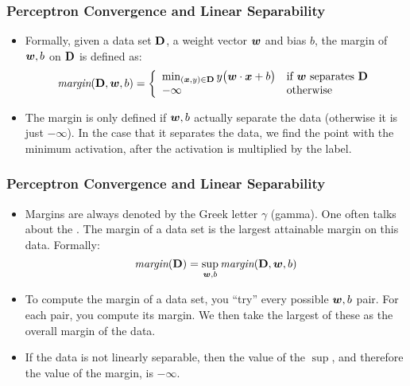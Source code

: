 \documentclass[trans]{beamer}
\begin{document}
\begin{frame}
  \frametitle{Perceptron Convergence and Linear Separability}
\begin{itemize}
\item
Formally, given a data set $\text{\bf D}$, a weight vector ${\boldsymbol{w}}$ and bias
$b$, the margin of ${\boldsymbol{w}},b$ on $\text{\bf D}$ is defined as:
\begin{equation} \label{eq:margin}
\textit{margin}(\text{\bf D}, {\boldsymbol{w}}, b)
= \left\{\begin{array}{ll}
     \min_{({\boldsymbol{x}},y) \in \text{\bf D}} y \big( {\boldsymbol{w}} \cdot {\boldsymbol{x}} + b \big)
      & \text{if ${\boldsymbol{w}}$ separates $\text{\bf D}$} \\
    -\infty & \text{otherwise}
\end{array}\right.
\end{equation}
\item The margin is only defined if ${\boldsymbol{w}},b$ actually separate the
data (otherwise it is just $-\infty$).  In the case that it separates
the data, we find the point with the minimum activation, after the
activation is multiplied by the label.
\end{itemize}
\end{frame}
\begin{frame}
  \frametitle{Perceptron Convergence and Linear Separability}
\begin{itemize}
\item Margins
are always denoted by the Greek letter $\gamma$ (gamma).  One often
talks about the .  The margin of a data
set is the largest attainable margin on this data.  Formally:
\begin{equation} \label{eq:margin2}
\textit{margin}(\text{\bf D})
= 
\sup_{{\boldsymbol{w}},b} \textit{margin}(\text{\bf D}, {\boldsymbol{w}}, b)
\end{equation}
\item To compute the margin of a data set, you ``try'' every
possible ${\boldsymbol{w}},b$ pair.  For each pair, you compute its margin.  We
then take the largest of these as the overall margin of the
data.%
\item     If the data is not linearly separable, then the value
of the $\sup$, and therefore the value of the margin, is $-\infty$.
\end{itemize}
\end{frame}
\end{document}
